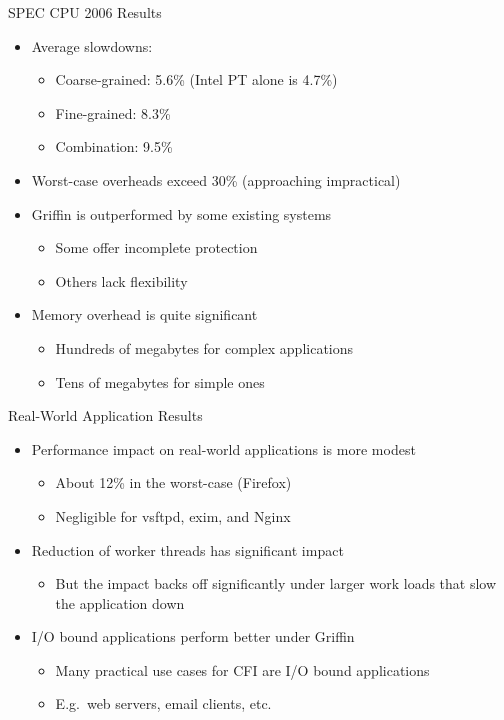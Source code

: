 \documentclass[12pt, dvipsnames, aspectratio=169]{beamer}
\begin{document}
\begin{frame}[c]{SPEC CPU 2006 Results}{}
  \begin{itemize}
    \item Average slowdowns:
    \begin{itemize}
      \item Coarse-grained: 5.6\% (Intel PT alone is 4.7\%)
      \item Fine-grained: 8.3\%
      \item Combination: 9.5\%
    \end{itemize}

    \vfill
    \item Worst-case overheads exceed 30\% (approaching impractical)

    \vfill
    \item Griffin is outperformed by some existing systems
    \begin{itemize}
      \item Some offer incomplete protection
      \item Others lack flexibility
    \end{itemize}

    \vfill
    \item Memory overhead is quite significant
    \begin{itemize}
      \item Hundreds of megabytes for complex applications
      \item Tens of megabytes for simple ones
    \end{itemize}
  \end{itemize}
\end{frame}

\begin{frame}[c]{Real-World Application Results}{}
  \begin{itemize}
    \item Performance impact on real-world applications is more modest
    \begin{itemize}
      \item About 12\% in the worst-case (Firefox)
      \item Negligible for vsftpd, exim, and Nginx
    \end{itemize}

    \vfill
    \item Reduction of worker threads has significant impact
    \begin{itemize}
      \item But the impact backs off significantly under larger work loads that slow the application down
    \end{itemize}

    \vfill
    \item I/O bound applications perform better under Griffin
    \begin{itemize}
      \item Many practical use cases for CFI are I/O bound applications
      \item E.g.~web servers, email clients, etc.
    \end{itemize}
  \end{itemize}
\end{frame}
\end{document}
